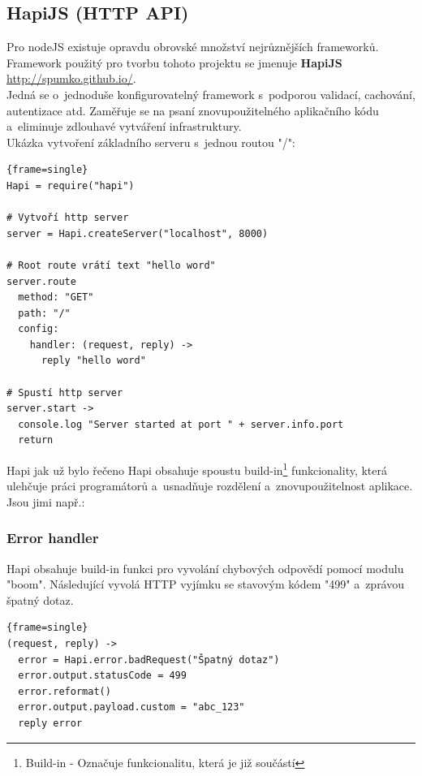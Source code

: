\documentclass[a4paper,12pt,twoside,BCOR=10mm]{article}
\renewcommand{\b}[1]{\textbf{#1}} %
\newenvironment{codeframe}{%
  \begin{Sbox} 
    \begin{minipage} 
      {\columnwidth-\leftmargin-\rightmargin-2\fboxsep-2\fboxrule-4pt} 
}{%

  \end{minipage} 
  \end{Sbox} 
  \begin{center} 
    \fcolorbox{black}{codeback}{\TheSbox} 
  \end{center} 
}
\begin{document}
\subsection{HapiJS (HTTP API)}
Pro nodeJS existuje opravdu obrovské množství nejrůznějších frameworků. Framework použitý pro tvorbu tohoto projektu se jmenuje \b{HapiJS} \href{http://spumko.github.io/}{http://spumko.github.io/}.\\
Jedná se o~jednoduše konfigurovatelný framework s~podporou validací, cachování, autentizace atd. Zaměřuje se na psaní znovupoužitelného aplikačního kódu a~eliminuje zdlouhavé vytváření infrastruktury.\cite{hapiJS}\\

Ukázka vytvoření základního serveru s~jednou routou "/":

     \begin{codeframe} 
      \begin{Verbatim}{frame=single}
Hapi = require("hapi")

# Vytvoří http server
server = Hapi.createServer("localhost", 8000)

# Root route vrátí text "hello word"
server.route
  method: "GET"
  path: "/"
  config:
    handler: (request, reply) ->
      reply "hello word"

# Spustí http server
server.start ->
  console.log "Server started at port " + server.info.port
  return
\end{Verbatim} 
    \end{codeframe}

Hapi jak už bylo řečeno Hapi obsahuje spoustu build-in\footnote{Build-in - Označuje funkcionalitu, která je již součástí} funkcionality, která ulehčuje práci programátorů a~usnadňuje rozdělení a~znovupoužitelnost aplikace. Jsou jimi např.:\\

\subsubsection{Error handler}
Hapi obsahuje build-in funkci pro vyvolání chybových odpovědí pomocí modulu "boom". Následující vyvolá HTTP vyjímku se stavovým kódem "499" a~zprávou špatný dotaz.\cite{hapiJSDOC}

     \begin{codeframe} 
      \begin{Verbatim}{frame=single}
(request, reply) ->
  error = Hapi.error.badRequest("Špatný dotaz")
  error.output.statusCode = 499
  error.reformat()
  error.output.payload.custom = "abc_123"
  reply error
\end{Verbatim} 
    \end{codeframe}
\end{document}
